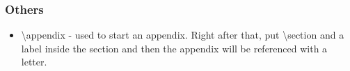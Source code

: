 
\subsubsection{Others}
\begin{itemize}
    \item \textbackslash appendix - used to start an appendix. Right after that, put \textbackslash section and a label inside the section and then the appendix will be referenced with a letter.
\end{itemize}

